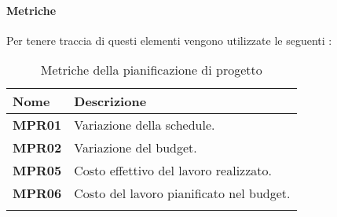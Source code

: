 \paragraph{Metriche}%
Per tenere traccia di questi elementi vengono utilizzate le seguenti :

\setlength{\freewidth}{\dimexpr\textwidth-0\tabcolsep}
	\renewcommand{\arraystretch}{1.5}
	\setlength{\aboverulesep}{0pt}
	\setlength{\belowrulesep}{0pt}
	\begin{longtable}{L{.365\freewidth} L{.6 \freewidth}}
		\textbf{Nome} & \textbf{Descrizione} \\
		\toprule
		\endhead		
		\textbf{MPR01} & Variazione della schedule. \\
		\textbf{MPR02} & Variazione del budget. \\
		\textbf{MPR05} & Costo effettivo del lavoro realizzato. \\
		\textbf{MPR06} & Costo del lavoro pianificato nel budget. \\
		\bottomrule
		\hiderowcolors
		\caption{Metriche della pianificazione di progetto}
	\end{longtable}
\newpage{}

